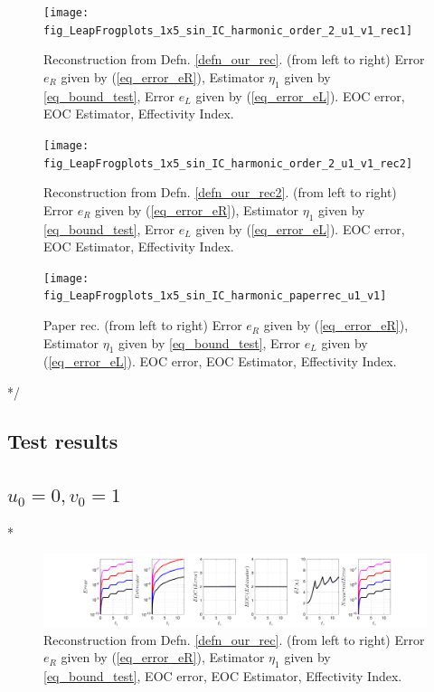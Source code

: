 \documentclass[12pt,a4paper]{article}
\numberwithin{equation}{section}
\theoremstyle{definition}
\begin{document}
\begin{figure}[H]
	\hspace{-3cm}
	\texttt{[image: fig\_LeapFrogplots\_1x5\_sin\_IC\_harmonic\_order\_2\_u1\_v1\_rec1]}	
	\caption{Reconstruction from Defn. \ref{defn_our_rec}. (from left to right) Error $e_R$ given by (\ref{eq_error_eR}), Estimator $\eta_1$ given by \ref{eq_bound_test}, Error $e_L$ given by  (\ref{eq_error_eL}). EOC error, EOC Estimator, Effectivity Index.}
	\label{fig_all_in_one_our_rec_1_u1_v1}
\end{figure}

\begin{figure}[H]
	\hspace{-3cm}
	\texttt{[image: fig\_LeapFrogplots\_1x5\_sin\_IC\_harmonic\_order\_2\_u1\_v1\_rec2]}	
	\caption{Reconstruction from Defn. \ref{defn_our_rec2}. (from left to right) Error $e_R$ given by (\ref{eq_error_eR}), Estimator $\eta_1$ given by \ref{eq_bound_test}, Error $e_L$ given by  (\ref{eq_error_eL}). EOC error, EOC Estimator, Effectivity Index.}
	\label{fig_all_in_one_our_rec_2_u1_v1}
\end{figure}

\begin{figure}[H]
	\hspace{-3cm}
	\texttt{[image: fig\_LeapFrogplots\_1x5\_sin\_IC\_harmonic\_paperrec\_u1\_v1]}	
	\caption{Paper rec.   (from left to right) Error $e_R$ given by (\ref{eq_error_eR}), Estimator $\eta_1$ given by \ref{eq_bound_test}, Error $e_L$ given by  (\ref{eq_error_eL}). EOC error, EOC Estimator, Effectivity Index. }
	\label{fig_all_in_one_paper_rec_2_u1_v1}
\end{figure}


*/
\subsection{Test results}\label{sec:num_exp}
\subsection*{$u_0=0, v_0= 1$}
\/*
\begin{figure}[H]
	\hspace{-3cm}
	\includegraphics[scale=0.55]{fig_LeapFrogplots_1x5_sin_IC_harmonic_order_2_u0_v10_rec_george}	
	\caption{Reconstruction from Defn. \ref{defn_our_rec}. (from left to right) Error $e_R$ given by (\ref{eq_error_eR}), Estimator $\eta_1$ given by \ref{eq_bound_test}, EOC error, EOC Estimator, Effectivity Index.}
	\label{fig_all_in_one_our_rec_george_u0_v10}
\end{figure}
\end{document}

